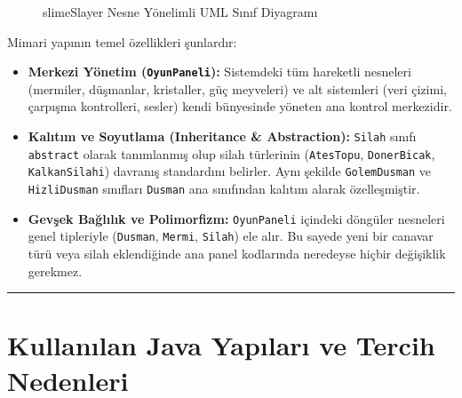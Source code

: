 \documentclass[12pt]{article}
\begin{document}
\begin{figure}[htbp]
    \caption{slimeSlayer Nesne Yönelimli UML Sınıf Diyagramı}
    \label{fig:uml}
\end{figure}

Mimari yapının temel özellikleri şunlardır:
\begin{itemize}
    \item \textbf{Merkezi Yönetim (\texttt{OyunPaneli}):} Sistemdeki tüm hareketli nesneleri (mermiler, düşmanlar, kristaller, güç meyveleri) ve alt sistemleri (veri çizimi, çarpışma kontrolleri, sesler) kendi bünyesinde yöneten ana kontrol merkezidir.
    \item \textbf{Kalıtım ve Soyutlama (Inheritance \& Abstraction):} \texttt{Silah} sınıfı \texttt{abstract} olarak tanımlanmış olup silah türlerinin (\texttt{AtesTopu}, \texttt{DonerBicak}, \texttt{KalkanSilahi}) davranış standardını belirler. Aynı şekilde \texttt{GolemDusman} ve \texttt{HizliDusman} sınıfları \texttt{Dusman} ana sınıfından kalıtım alarak özelleşmiştir.
    \item \textbf{Gevşek Bağlılık ve Polimorfizm:} \texttt{OyunPaneli} içindeki döngüler nesneleri genel tipleriyle (\texttt{Dusman}, \texttt{Mermi}, \texttt{Silah}) ele alır. Bu sayede yeni bir canavar türü veya silah eklendiğinde ana panel kodlarında neredeyse hiçbir değişiklik gerekmez.
\end{itemize}

\bigskip
\hrule
\bigskip

\section{Kullanılan Java Yapıları ve Tercih Nedenleri}
\end{document}
